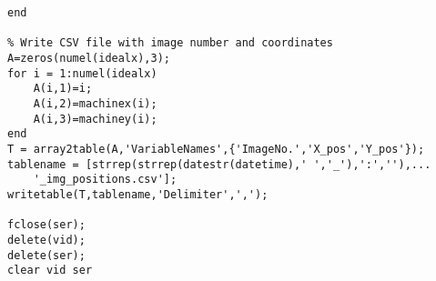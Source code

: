 \begin{lstlisting}
end

% Write CSV file with image number and coordinates
A=zeros(numel(idealx),3);
for i = 1:numel(idealx)
    A(i,1)=i;
    A(i,2)=machinex(i);
    A(i,3)=machiney(i);
end
T = array2table(A,'VariableNames',{'ImageNo.','X_pos','Y_pos'});
tablename = [strrep(strrep(datestr(datetime),' ','_'),':',''),...
    '_img_positions.csv'];
writetable(T,tablename,'Delimiter',',');

fclose(ser);
delete(vid);
delete(ser);
clear vid ser

\end{lstlisting}
